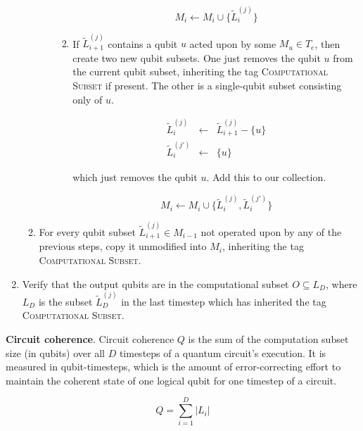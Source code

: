 \begin{enumerate}
\begin{enumerate}
\begin{enumerate}
\begin{enumerate}
\begin{equation*}
M_i \leftarrow M_i \cup \{ \tilde{L}^{(j)}_{i} \}
\end{equation*}

\item
If $\tilde{L}^{(j)}_{i+1}$ contains a qubit $u$ acted upon by some $M_u \in T_e$,
then create two new qubit subsets. One just removes the qubit $u$
from the current qubit subset, inheriting the tag \textsc{Computational Subset}
if present. The other is a single-qubit subset consisting
only of $u$.

\begin{eqnarray*}
\tilde{L}^{(j)}_{i} & \leftarrow & \tilde{L}^{(j)}_{i+1} - \{u\} \\
\tilde{L}^{(j')}_{i} & \leftarrow & \{ u \}
\end{eqnarray*}

which just removes the qubit $u$. Add this to our collection.

\begin{equation*}
M_i \leftarrow M_i \cup \{ \tilde{L}^{(j)}_{i}, \tilde{L}^{(j')}_{i} \}
\end{equation*}

\end{enumerate}

\end{enumerate}

\item For every qubit subset $\tilde{L}^{(j)}_{i+1} \in M_{i-1}$ not
operated upon by any of the previous steps, copy it unmodified into
$M_i$, inheriting the tag \textsc{Computational Subset}.

\end{enumerate}

\item
Verify that the output qubits are in the computational subset $O \subseteq L_D$,
where $L_D$ is the subset $\tilde{L}^{(j)}_D$ in the last timestep which has
inherited the tag \textsc{Computational Subset}.

\end{enumerate}


\begin{definition}{\textbf{Circuit coherence}.}
Circuit coherence $Q$ is the sum of the computation subset size (in qubits)
over all $D$ timesteps of a quantum circuit's execution. It is measured
in qubit-timesteps, which is the amount of error-correcting effort to
maintain the coherent state of one logical qubit for one timestep of a circuit.

\begin{equation}
Q = \sum_{i=1}^D |L_i|
\end{equation}
\end{definition}


